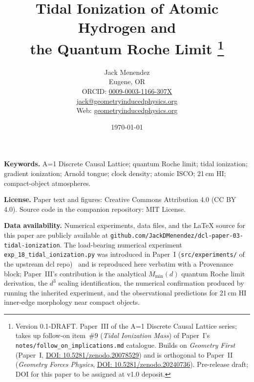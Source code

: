 \documentclass[12pt, letterpaper]{article}
\title{Tidal Ionization of Atomic Hydrogen and\\
       the Quantum Roche Limit%
       \thanks{Version 0.1-DRAFT.  Paper~III of the A=1 Discrete
       Causal Lattice series; takes up follow-on item~\#9
       (\emph{Tidal Ionization Mass}) of Paper~I's
       \texttt{notes/follow\_on\_implications.md} catalogue.
       Builds on \emph{Geometry First}
       (Paper~I,
       \href{https://doi.org/10.5281/zenodo.20078529}{DOI:
       10.5281/zenodo.20078529}) and is orthogonal to Paper~II
       (\emph{Geometry Forces Physics},
       \href{https://doi.org/10.5281/zenodo.20240736}{DOI:
       10.5281/zenodo.20240736}).
       Pre-release draft; DOI for this paper to be assigned at
       v1.0 deposit.}}
\author{Jack Menendez\\
        \small Eugene, OR\\
        \small ORCID: \href{https://orcid.org/0009-0003-1166-307X}{0009-0003-1166-307X}\\
        \small \href{mailto:jack@geometryinducedphysics.org}{jack@geometryinducedphysics.org}\\
        \small Web: \href{https://geometryinducedphysics.org/}{geometryinducedphysics.org}}
\date{\today}
\begin{document}
\maketitle

\begin{abstract}
    
\end{abstract}


\medskip
\noindent\textbf{Keywords.}  A=1 Discrete Causal Lattice; quantum
Roche limit; tidal ionization; gradient ionization; Arnold tongue;
clock density; atomic ISCO; 21\,cm HI; compact-object atmospheres.

\medskip
\noindent\textbf{License.}  Paper text and figures: Creative Commons
Attribution 4.0 (CC BY 4.0).  Source code in the companion
repository: MIT License.

\medskip
\noindent\textbf{Data availability.}  Numerical experiments, data
files, and the \LaTeX{} source for this paper are publicly available
at \nolinkurl{github.com/JackDMenendez/dcl-paper-03-tidal-ionization}.
The load-bearing numerical experiment
\nolinkurl{exp_18_tidal_ionization.py} was introduced in Paper~I
(\texttt{src/experiments/} of the upstream dcl
repo)~\cite{menendez2026geometry} and is reproduced here verbatim
with a Provenance block; Paper~III's contribution is the
analytical $M_\text{min}(d)$ quantum Roche limit derivation, the
$d^3$ scaling identification, the numerical confirmation produced by
running the inherited experiment, and the observational predictions
for 21\,cm HI inner-edge morphology near compact objects.



\newpage
\tableofcontents
\newpage

\end{document}

